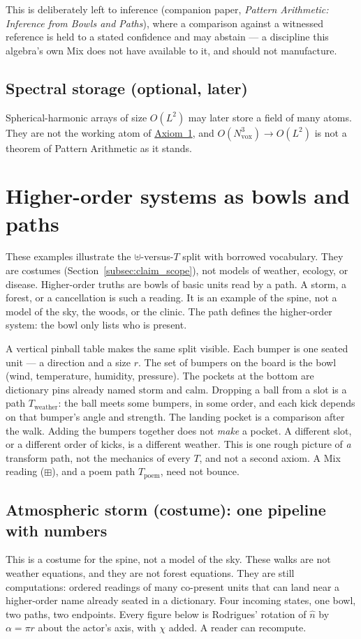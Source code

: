 \documentclass[12pt, a4paper]{article}
\begin{document}
This is deliberately left to inference (companion paper,
\emph{Pattern Arithmetic: Inference from Bowls and Paths}), where a
comparison against a witnessed reference is held to a stated
confidence and may abstain --- a discipline this algebra's own Mix
does not have available to it, and should not manufacture.

\subsection{Spectral storage (optional, later)}
Spherical-harmonic arrays of size $O(L^2)$ may later store a field of
many atoms. They are not the working atom of
\hyperref[subsec:axiom1]{Axiom~1}, and $O(N_{\mathrm{vox}}^3)\to O(L^2)$ is not a theorem of
Pattern Arithmetic as it stands.

\section{Higher-order systems as bowls and paths}
\label{sec:higher_order}
These examples illustrate the $\uplus$-versus-$T$ split with borrowed
vocabulary. They are costumes
(Section~\ref{subsec:claim_scope}), not models of weather, ecology,
or disease.
Higher-order truths are bowls of basic units read by a path.
A storm, a forest, or a cancellation is such a reading.
It is an example of the spine, not a model of the sky, the woods,
or the clinic. The path defines the higher-order system: the bowl
only lists who is present.

A vertical pinball table makes the same split visible. Each bumper
is one seated unit --- a direction and a size \(r\). The set of
bumpers on the board is the bowl (wind, temperature, humidity,
pressure). The pockets at the bottom are dictionary pins already
named \(\mathrm{storm}\) and \(\mathrm{calm}\). Dropping a ball from
a slot is a path \(T_{\mathrm{weather}}\): the ball meets some
bumpers, in some order, and each kick depends on that bumper's
angle and strength. The landing pocket is a comparison after the
walk. Adding the bumpers together does not \emph{make} a pocket.
A different slot, or a different order of kicks, is a different
weather. This is one rough picture of \emph{a} transform path, not
the mechanics of every $T$, and not a second axiom. A Mix reading ($\boxplus$), and a poem path $T_{\mathrm{poem}}$, need not bounce.

\subsection{Atmospheric storm (costume): one pipeline with numbers}
\label{subsec:storm_pipeline}
This is a costume for the spine, not a model of the sky.
These walks are not weather equations, and they are not forest
equations. They are still computations: ordered readings of many
co-present units that can land near a higher-order name already
seated in a dictionary.
Four incoming
states, one bowl, two paths, two endpoints. Every figure below is
Rodrigues' rotation of $\hat n$ by $\alpha=\pi r$ about the actor's
axis, with $\chi$ added. A reader can recompute.
\end{document}
